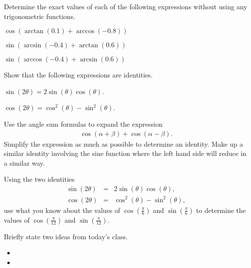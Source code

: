 \begin{problem}
\item Determine the exact values of each of the following expressions
  without using any trigonometric functions.
  \begin{subproblem}
  \item ${\displaystyle \cos(\arctan(0.1)+\arccos(-0.8))}$
    \vfill
  \item ${\displaystyle \sin(\arcsin(-0.4)+\arctan(0.6))}$
    \vfill
  \item ${\displaystyle \sin(\arccos(-0.4)+\arcsin(0.6))}$
    \vfill
  \end{subproblem}

  \clearpage

\item Show that the following expressions are identities.
  \begin{subproblem}
  \item ${\displaystyle \sin(2\theta)=2\sin(\theta)\cos(\theta)}$.
    \vfill
  \item ${\displaystyle \cos(2\theta)=\cos^2(\theta)-\sin^2(\theta)}$.
    \vfill
  \end{subproblem}

\item Use the angle sum formulas to expand the expression
  \begin{eqnarray*}
    \cos(\alpha+\beta) + \cos(\alpha-\beta).
  \end{eqnarray*}
  Simplify the expression as much as possible to determine an
  identity.  Make up a similar identity involving the sine function
  where the left hand side will reduce in a similar way.

  \vfill

  \clearpage

\item Using the two identities
  \begin{eqnarray*}
    \sin(2\theta) & = & 2\sin(\theta)\cos(\theta), \\
    \cos(2\theta) & = & \cos^2(\theta)-\sin^2(\theta),
  \end{eqnarray*}
  use what you know about the values of $\cos\left(\frac{\pi}{6}\right)$ and
    $\sin\left(\frac{\pi}{6}\right)$ to determine the values of
      $\cos\left(\frac{\pi}{12}\right)$ and $\sin\left(\frac{\pi}{12}\right)$.

  \vfill
  
\end{problem}

\postClass

\begin{problem}
\item Briefly state two ideas from today's class.
  \begin{itemize}
  \item 
  \item 
  \end{itemize}
\item 
  \begin{subproblem}
    \item
  \end{subproblem}
\end{problem}



